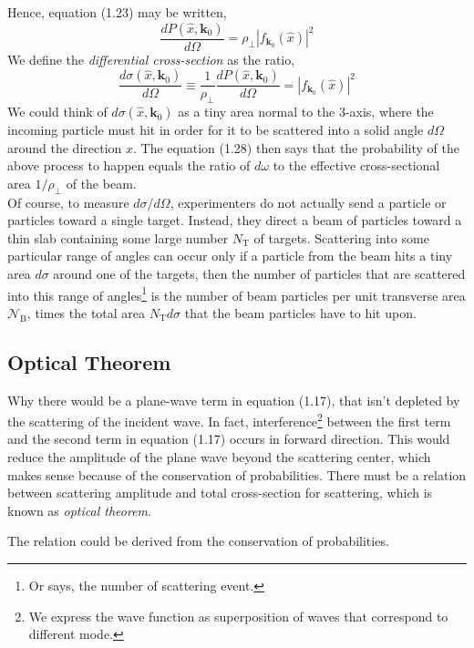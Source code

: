 \documentclass[12pt]{article}
\numberwithin{equation}{section}
\begin{document}
Hence, equation (1.23) may be written,
\begin{equation}
    \frac{dP(\hat{x}, \mathbf{k}_{0})}{d\Omega} = \rho_{\perp}\left|f_{\mathbf{k}_{0}}(\hat{x})\right|^2
\end{equation}
We define the \textit{differential cross-section} as the ratio,
\begin{equation}
    \frac{d\sigma(\hat{x}, \mathbf{k}_{0})}{d\Omega} \equiv \frac{1}{\rho_{\perp}}\frac{dP(\hat{x}, \mathbf{k}_0)}{d\Omega} = \left|f_{\mathbf{k}_0}(\hat{x})\right|^2
\end{equation}
We could think of $d\sigma(\hat{x}, \mathbf{k}_0)$ as a tiny area normal to the 3-axis, where the incoming particle must hit in order for it to be scattered into a solid angle $d\Omega$ around the direction $\hat{x}$.
The equation (1.28) then says that the probability of the above process to happen equals the ratio of $d\omega$ to the effective cross-sectional area $1/\rho_{\perp}$ of the beam.
\\\indent Of course, to measure $d\sigma/d\Omega$, experimenters do not actually send a particle or particles toward a single target. 
Instead, they direct a beam of particles toward a thin slab containing some large number $N_{\text{T}}$ of targets.
Scattering into some particular range of angles can occur only if a particle from the beam hits a tiny area $d\sigma$ around one of the targets, then the number of particles that are scattered into this range of angles\footnote{Or says, the number of scattering event.} is the number of beam particles per unit transverse area $\mathcal{N}_{\text{B}}$, times the total area $N_{\text{T}}d\sigma$ that the beam particles have to hit upon.
\subsection{Optical Theorem}
Why there would be a plane-wave term in equation (1.17), that isn't depleted by the scattering of the incident wave.
In fact, interference\footnote{We express the wave function as superposition of waves that correspond to different mode.} between the first term and the second term in equation (1.17) occurs in forward direction.
This would reduce the amplitude of the plane wave beyond the scattering center, which makes sense because of the conservation of probabilities.
There must be a relation between scattering amplitude and total cross-section for scattering, which is known as \textit{optical theorem}.

The relation could be derived from the conservation of probabilities. 
\end{document}
